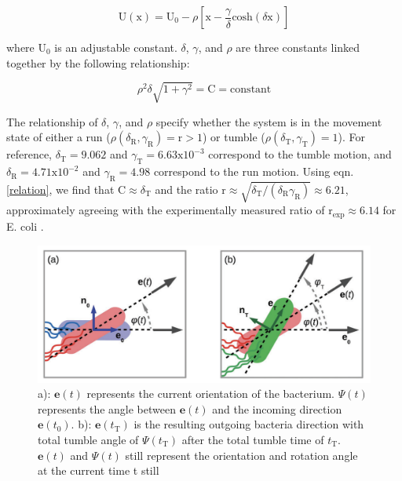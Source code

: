 \documentclass[11pt]{article}
\begin{document}
\begin{equation}\label{potential}
    \text{U}(\text{x}) = \text{U}_{0}-\rho\left[\text{x}-\frac{\gamma}{\delta}\text{cosh}(\delta \text{x})\right]
\end{equation}

\noindent where $\text{U}_{0}$ is an adjustable constant.  $\delta$, $\gamma$, and $\rho$ are three constants linked together by the following relationship: 

\begin{equation}\label{relation}
    \rho^2\delta\sqrt{1+\gamma^2}=\text{C}=\text{constant}
\end{equation}

\noindent The relationship of $\delta$, $\gamma$, and $\rho$ specify whether the system is in the movement state of either a run ($\rho(\delta_\text{R},\gamma_\text{R})=\text{r}>1$) or tumble ($\rho(\delta_\text{T},\gamma_\text{T})=1$). For reference, $\delta_\text{T}=9.062$ and $\gamma_\text{T}=6.63 \text{x} 10^{-3}$ correspond to the tumble motion, and $\delta_\text{R}=4.71 \text{x} 10^{-2}$ and $\gamma_\text{R}=4.98$ correspond to the run motion.  Using eqn. \ref{relation}, we find that $\text{C}\approx \delta_\text{T}$ and the ratio $\text{r}\approx\sqrt{\delta_\text{T}/(\delta_\text{R}\gamma_\text{R})}\approx6.21$, approximately agreeing with the experimentally measured ratio of $\text{r}_{\text{exp}}\approx6.14$ for E. coli \cite{Berg5}.

\begin{figure}[ht]
\centering\includegraphics[width=0.8\linewidth]{Screen Shot 2020-09-18 at 3.21.13 PM.png}
\caption{a): $\boldsymbol{e}(t)$ represents the current orientation of the bacterium. $\Psi(t)$ represents the angle between $\boldsymbol{e}(t)$ and the incoming direction $\boldsymbol{e}(t_0)$. b): $\boldsymbol{e}(t_\text{T})$ is the resulting outgoing bacteria direction with total tumble angle of $\Psi(t_\text{T})$ after the total tumble time of $t_\text{T}$.  $\boldsymbol{e}(t)$ and $\Psi(t)$ still represent the orientation and rotation angle at the current time t still \cite{Fier2}}
\label{fig:rtpangle}
\end{figure}
\end{document}
